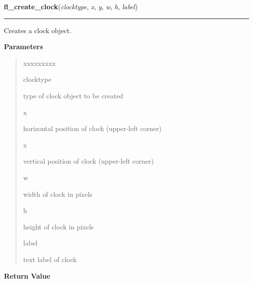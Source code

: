     \label{xformslib:library:fl_create_clock}

    \vspace{0.5ex}

\hspace{.8\funcindent}\begin{boxedminipage}{\funcwidth}

    \raggedright \textbf{fl\_create\_clock}(\textit{clocktype}, \textit{x}, \textit{y}, \textit{w}, \textit{h}, \textit{label})

    \vspace{-1.5ex}

    \rule{\textwidth}{0.5\fboxrule}
\setlength{\parskip}{2ex}
    Creates a clock object.

\setlength{\parskip}{1ex}
      \textbf{Parameters}
      \vspace{-1ex}

      \begin{quote}
        \begin{Ventry}{xxxxxxxxx}

          \item[clocktype]

          type of clock object to be created

          \item[x]

          horizontal position of clock (upper-left corner)

          \item[x]

          vertical position of clock (upper-left corner)

          \item[w]

          width of clock in pixels

          \item[h]

          height of clock in pixels

          \item[label]

          text label of clock

        \end{Ventry}

      \end{quote}

      \textbf{Return Value}
    \vspace{-1ex}


\end{boxedminipage}
